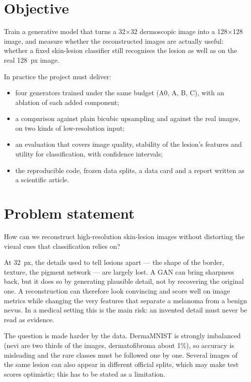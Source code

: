 \documentclass[11pt,a4paper]{article}
\begin{document}

\setcounter{page}{1}

\section{Objective}

Train a generative model that turns a 32$\times$32 dermoscopic image into a 128$\times$128 image,
and measure whether the reconstructed images are actually useful: whether a fixed skin-lesion
classifier still recognises the lesion as well as on the real 128~px image.

In practice the project must deliver:
\begin{itemize}
\item four generators trained under the same budget (A0, A, B, C), with an ablation of each added
component;
\item a comparison against plain bicubic upsampling and against the real images, on two kinds of
low-resolution input;
\item an evaluation that covers image quality, stability of the lesion's features and utility for
classification, with confidence intervals;
\item the reproducible code, frozen data splits, a data card and a report written as a scientific
article.
\end{itemize}

\section{Problem statement}

How can we reconstruct high-resolution skin-lesion images without distorting the visual cues that
classification relies on?

At 32~px, the details used to tell lesions apart --- the shape of the border, texture, the pigment
network --- are largely lost. A GAN can bring sharpness back, but it does so by generating plausible
detail, not by recovering the original one. A reconstruction can therefore look convincing and score
well on image metrics while changing the very features that separate a melanoma from a benign
nevus. In a medical setting this is the main risk: an invented detail must never be read as
evidence.

The question is made harder by the data. DermaMNIST is strongly imbalanced (nevi are two thirds of
the images, dermatofibroma about 1\%), so accuracy is misleading and the rare classes must be
followed one by one. Several images of the same lesion can also appear in different official splits,
which may make test scores optimistic; this has to be stated as a limitation.
\end{document}

